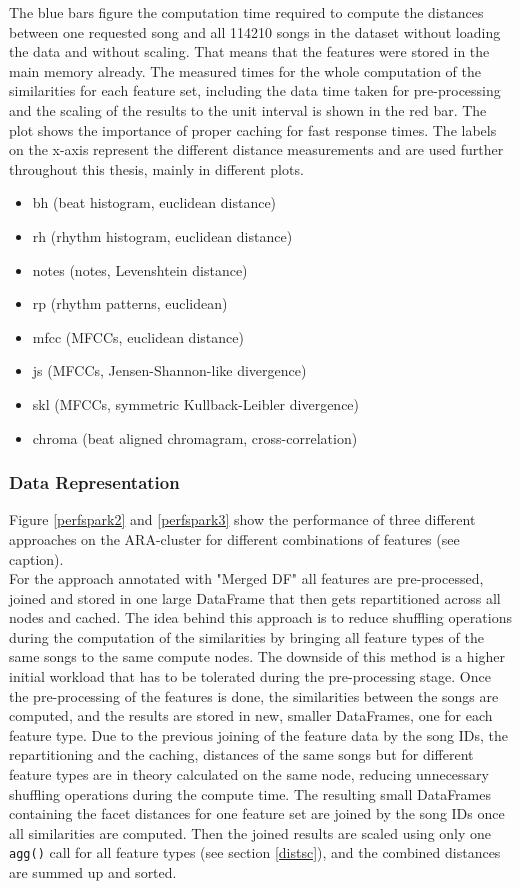 \noindent The blue bars figure the computation time required to compute the distances between one requested song and all 114210 songs in the dataset without loading the data and without scaling. That means that the features were stored in the main memory already. The measured times for the whole computation of the similarities for each feature set, including the data time taken for pre-processing and the scaling of the results to the unit interval is shown in the red bar. The plot shows the importance of proper caching for fast response times. 
\noindent The labels on the x-axis represent the different distance measurements and are used further throughout this thesis, mainly in different plots. 

\begin{itemize}
	\setlength\itemsep{-0.5em}
	\item bh (beat histogram, euclidean distance)
	\item rh (rhythm histogram, euclidean distance)
	\item notes (notes, Levenshtein distance)
	\item rp (rhythm patterns, euclidean)
	\item mfcc (MFCCs, euclidean distance)
	\item js (MFCCs, Jensen-Shannon-like divergence)
	\item skl (MFCCs, symmetric Kullback-Leibler divergence)
	\item chroma (beat aligned chromagram, cross-correlation)
\end{itemize}

\subsubsection{Data Representation}

\noindent Figure \ref {perfspark2} and \ref{perfspark3} show the performance of three different approaches on the ARA-cluster for different combinations of features (see caption).\\
\noindent For the approach annotated with "Merged DF" all features are pre-processed, joined and stored in one large DataFrame that then gets repartitioned across all nodes and cached. The idea behind this approach is to reduce shuffling operations during the computation of the similarities by bringing all feature types of the same songs to the same compute nodes. The downside of this method is a higher initial workload that has to be tolerated during the pre-processing stage. 
\noindent Once the pre-processing of the features is done, the similarities between the songs are computed, and the results are stored in new, smaller DataFrames, one for each feature type. Due to the previous joining of the feature data by the song IDs, the repartitioning and the caching, distances of the same songs but for different feature types are in theory calculated on the same node, reducing unnecessary shuffling operations during the compute time. The resulting small DataFrames containing the facet distances for one feature set are joined by the song IDs once all similarities are computed. Then the joined results are scaled using only one \lstinline{agg()} call for all feature types (see section \ref{distsc}), and the combined distances are summed up and sorted.


